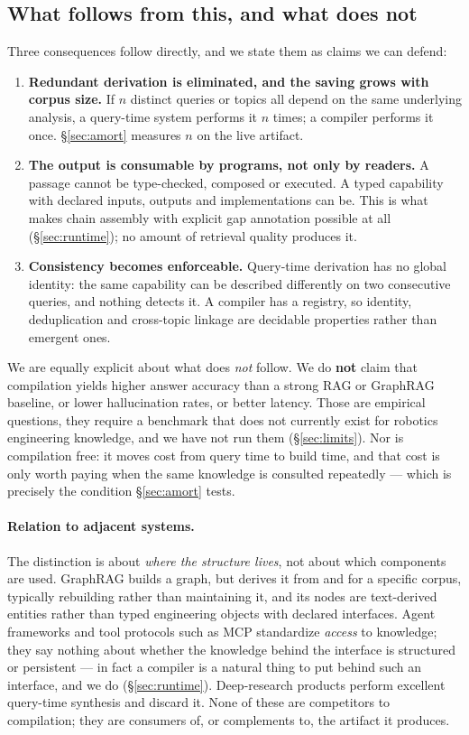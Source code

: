 \documentclass[10pt,a4paper]{article}
\begin{document}
\subsection{What follows from this, and what does not}

Three consequences follow directly, and we state them as claims we can defend:

\begin{enumerate}[leftmargin=1.4em,itemsep=3pt]
\item \textbf{Redundant derivation is eliminated, and the saving grows with
  corpus size.} If $n$ distinct queries or topics all depend on the same
  underlying analysis, a query-time system performs it $n$ times; a compiler
  performs it once. \S\ref{sec:amort} measures $n$ on the live artifact.
\item \textbf{The output is consumable by programs, not only by readers.} A
  passage cannot be type-checked, composed or executed. A typed capability with
  declared inputs, outputs and implementations can be. This is what makes chain
  assembly with explicit gap annotation possible at all
  (\S\ref{sec:runtime}); no amount of retrieval quality produces it.
\item \textbf{Consistency becomes enforceable.} Query-time derivation has no
  global identity: the same capability can be described differently on two
  consecutive queries, and nothing detects it. A compiler has a registry, so
  identity, deduplication and cross-topic linkage are decidable properties
  rather than emergent ones.
\end{enumerate}

We are equally explicit about what does \emph{not} follow. We do \textbf{not}
claim that compilation yields higher answer accuracy than a strong RAG or
GraphRAG baseline, or lower hallucination rates, or better latency. Those are
empirical questions, they require a benchmark that does not currently exist for
robotics engineering knowledge, and we have not run them
(\S\ref{sec:limits}). Nor is compilation free: it moves cost from query time to
build time, and that cost is only worth paying when the same knowledge is
consulted repeatedly --- which is precisely the condition
\S\ref{sec:amort} tests.

\paragraph{Relation to adjacent systems.} The distinction is about \emph{where
the structure lives}, not about which components are used. GraphRAG builds a
graph, but derives it from and for a specific corpus, typically rebuilding
rather than maintaining it, and its nodes are text-derived entities rather than
typed engineering objects with declared interfaces. Agent frameworks and tool
protocols such as MCP standardize \emph{access} to knowledge; they say nothing
about whether the knowledge behind the interface is structured or persistent ---
in fact a compiler is a natural thing to put behind such an interface, and we do
(\S\ref{sec:runtime}). Deep-research products perform excellent query-time
synthesis and discard it. None of these are competitors to compilation; they are
consumers of, or complements to, the artifact it produces.
\end{document}
